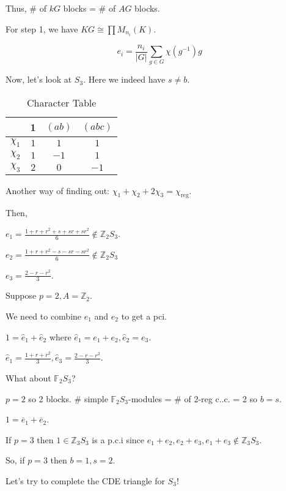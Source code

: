 \documentclass{article}
\theoremstyle{definition}
\begin{document}
Thus, \# of \(kG\) blocks = \# of \(AG\) blocks.

For step 1, we have \(KG \cong \prod M_{n_i}(K)\).

\[
    e_i = \frac{n_i}{\vert G \vert} \sum_{g\in G} \chi (g ^{-1})g
\]

Now, let's look at \(S_3\). Here we indeed have \(s \neq b\).

\begin{table}[H]
    \centering
    \begin{tabular}{c|c|c|c}
        \toprule
             & 1 & \((ab)\) & \((abc)\) \\
        \midrule
            \(\chi_1\) & \(1\) & \(1\) & \(1\) \\
            \(\chi_2\) & \(1\) & \(-1\) & \(1\) \\
            \(\chi_3\) & \(2\) & \(0\) & \(-1\) \\
        \bottomrule
    \end{tabular}
    \caption{Character Table}
\end{table}

Another way of finding out: \(\chi_1 + \chi_2 + 2 \chi_3 = \chi_\text{reg}\).

Then,

\(e_1 = \frac{1+r+r^2 + s + sr + sr^2}{6} \notin \mathbb{Z}_2 S_3\).

\(e_2 = \frac{1 + r + r^2 - s - sr - sr^2}{6} \notin \mathbb{Z}_2 S_3\) 

\(e_3 = \frac{2 - r - r^2}{3}\).

Suppose \(p = 2, A = \mathbb{Z}_2\).

We need to combine \(e_1\) and \(e_2\) to get a pci.



\(1 = \widehat{e}_1+\widehat{e}_2\) where \(\widehat{e}_1 = e_1 + e_2, \widehat{e}_2 = e_3\).

\(\widehat{e}_1 = \frac{1 + r + r^2}{3}, \widehat{e}_3 = \frac{2 - r - r^2}{3}\).

What about \(\mathbb{F}_2 S_3\)?

\(p = 2\) so 2 blocks. \# simple \(\mathbb{F}_2 S_3\)-modules = \# of 2-reg c..c. = 2 so \(b=s\).

\(1 = \overline{e}_1 + \overline{e}_2\).

If \(p = 3\) then \(1\in \mathbb{Z}_3 S_3\) is a p.c.i since \(e_1 + e_2, e_2 + e_3, e_1 + e_3 \notin \mathbb{Z}_3 S_3\).

So, if \(p=3\) then \(b=1, s=2\).

Let's try to complete the CDE triangle for \(S_3\)!
\end{document}
